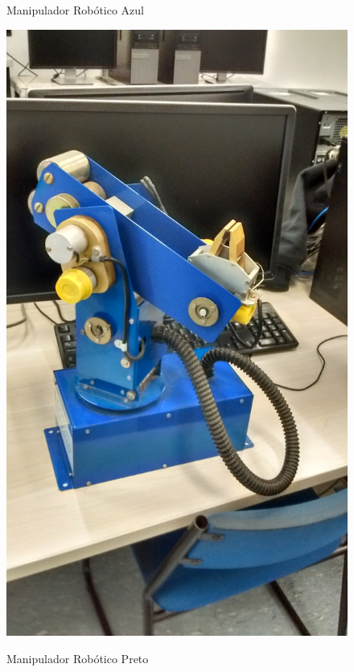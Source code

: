 \begin{figure}[H]
    \begin{minipage}{.5\textwidth}
        \centering
        \caption{Manipulador Robótico Azul}
        \includegraphics[keepaspectratio=true, width=0.9\linewidth]
            {img/foto-manipulador-azul.jpg}
        \label{fig:fotoManipuladorAzul}
    \end{minipage}%
    \begin{minipage}{.5\textwidth}
        \centering
        \caption{Manipulador Robótico Preto}

\end{minipage}
\end{figure}

